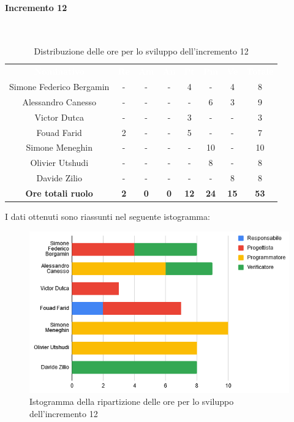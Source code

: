 \paragraph*{Incremento 12}\mbox{} \\
\begin{table}[H]
\centering\renewcommand{\arraystretch}{1.5}
\caption{Distribuzione delle ore per lo sviluppo dell'incremento 12}
\vspace{0.2cm}
\begin{tabular}{ c c c c c c c c }
\rowcolor{redafk}
\textcolor{white}{\textbf{Nominativo}} & \textcolor{white}{\textbf{Re}} &
\textcolor{white}{\textbf{Am}} & \textcolor{white}{\textbf{An}} &
\textcolor{white}{\textbf{Pt}} & \textcolor{white}{\textbf{Pm}} &
\textcolor{white}{\textbf{Ve}} & \textcolor{white}{\textbf{Totale}} \\
Simone Federico Bergamin & - & - & - & 4 & - & 4 & 8 \\
Alessandro Canesso & - & - & - & - & 6 & 3 & 9 \\
Victor Dutca & - & - & - & 3 & - & - & 3 \\
Fouad Farid & 2 & - & - & 5 & - & - & 7 \\
Simone Meneghin & - & - & - & - & 10 & - & 10 \\
Olivier Utshudi & - & - & - & - & 8 & - & 8 \\
Davide Zilio & - & - & - & - & - & 8 & 8 \\
\rowcolor{lastrowcolor}
\textbf{Ore totali ruolo} & \textbf{2} & \textbf{0} & \textbf{0} & \textbf{12} & \textbf{24} & \textbf{15} & \textbf{53} \\
\end{tabular}
\end{table}

I dati ottenuti sono riassunti nel seguente istogramma:
\begin{figure}[H]
\centering
\includegraphics[scale=0.60]{img/grafici/tabella_inc12.png}
\caption{Istogramma della ripartizione delle ore per lo sviluppo dell'incremento 12}
\end{figure}

